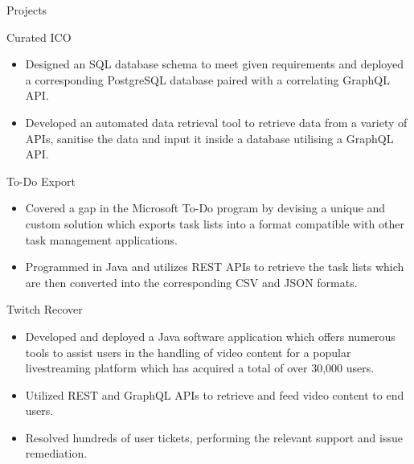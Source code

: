 \documentclass{article}
\newlength{\tabin}
\newlength{\secsep}
\newcommand{\lineunder}{\vspace*{-8pt} \\ \hspace*{-6pt} \hrulefill \\ \vspace*{-15pt}}
\newenvironment{tabbedsection}[1]{
  \begin{list}{}{
      \setlength{\itemsep}{0pt}
      \setlength{\labelsep}{0pt}
      \setlength{\labelwidth}{0pt}
      \setlength{\leftmargin}{\tabin}
      \setlength{\rightmargin}{\tabin}
      \setlength{\listparindent}{0pt}
      \setlength{\parsep}{0pt}
      \setlength{\parskip}{0pt}
      \setlength{\partopsep}{0pt}
      \setlength{\topsep}{#1}
    }
  \item[]
}{\end{list}}
\newenvironment{resume_section}[1]{
  \filbreak
  \vspace{2\secsep}
  \textsc{\large#1}
  \lineunder
  \begin{tabbedsection}{\secsep}
}{\end{tabbedsection}}
\newenvironment{resume_subsection}[2][]{
  \textbf{#2} \hfill {\normalsize #1} \hspace{-5em}
  \begin{tabbedsection}{0.5\secsep}
}{\end{tabbedsection}}
\newenvironment{subitems}{
  \renewcommand{\labelitemi}{-}
  \begin{itemize}
      \setlength{\labelsep}{1em}
}{\end{itemize}}
\begin{document}
\begin{resume_section}{Projects}
	\begin{resume_subsection}{Curated ICO}
		\begin{subitems}
			\item Designed an SQL database schema to meet given requirements and deployed a corresponding PostgreSQL database paired with a correlating GraphQL API.
			\item Developed an automated data retrieval tool to retrieve data from a variety of APIs, sanitise the data and input it inside a database utilising a GraphQL API.
		\end{subitems}
	\end{resume_subsection}
	\vspace{3\secsep}
	\begin{resume_subsection}[(February 2021)]{To-Do Export}
  		\begin{subitems} 
  			\item Covered a gap in the Microsoft To-Do program by devising a unique and custom solution which exports task lists into a format compatible with other task management applications.
  			\item Programmed in Java and utilizes REST APIs to retrieve the task lists which are then converted into the corresponding CSV and JSON formats.
    		\end{subitems}
  	\end{resume_subsection}
  	\vspace{3\secsep}
	\begin{resume_subsection}{Twitch Recover}  
		\begin{subitems}
    			\item Developed and deployed a Java software application which offers numerous tools to assist users in the handling of video content for a popular livestreaming platform which has acquired a total of over 30,000 users.
    			\item Utilized REST and GraphQL APIs to retrieve and feed video content to end users.
    			\item Resolved hundreds of user tickets, performing the relevant support and issue remediation.

\end{subitems}
\end{resume_subsection}
\end{resume_section}
\end{document}
